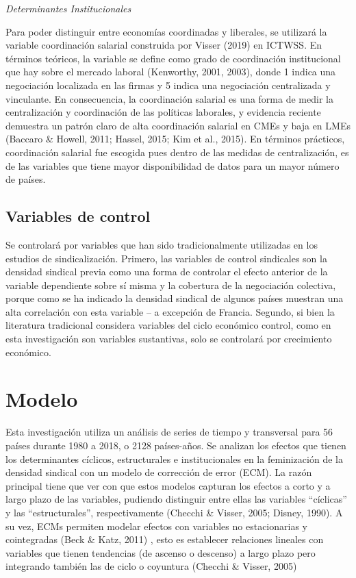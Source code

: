 \documentclass[
]{book}
\begin{document}
\emph{Determinantes Institucionales}

Para poder distinguir entre economías coordinadas y liberales, se utilizará la variable coordinación salarial construida por Visser (2019) en ICTWSS. En términos teóricos, la variable se define como grado de coordinación institucional que hay sobre el mercado laboral (Kenworthy, 2001, 2003), donde 1 indica una negociación localizada en las firmas y 5 indica una negociación centralizada y vinculante. En consecuencia, la coordinación salarial es una forma de medir la centralización y coordinación de las políticas laborales, y evidencia reciente demuestra un patrón claro de alta coordinación salarial en CMEs y baja en LMEs (Baccaro \& Howell, 2011; Hassel, 2015; Kim et al., 2015). En términos prácticos, coordinación salarial fue escogida pues dentro de las medidas de centralización, es de las variables que tiene mayor disponibilidad de datos para un mayor número de países.

\hypertarget{variables-de-control}{%
\subsection{Variables de control}\label{variables-de-control}}

Se controlará por variables que han sido tradicionalmente utilizadas en los estudios de sindicalización. Primero, las variables de control sindicales son la densidad sindical previa como una forma de controlar el efecto anterior de la variable dependiente sobre sí misma y la cobertura de la negociación colectiva, porque como se ha indicado la densidad sindical de algunos países muestran una alta correlación con esta variable -- a excepción de Francia. Segundo, si bien la literatura tradicional considera variables del ciclo económico control, como en esta investigación son variables sustantivas, solo se controlará por crecimiento económico.

\hypertarget{modelo}{%
\section{Modelo}\label{modelo}}

Esta investigación utiliza un análisis de series de tiempo y transversal para 56 países durante 1980 a 2018, o 2128 países-años. Se analizan los efectos que tienen los determinantes cíclicos, estructurales e institucionales en la feminización de la densidad sindical con un modelo de corrección de error (ECM). La razón principal tiene que ver con que estos modelos capturan los efectos a corto y a largo plazo de las variables, pudiendo distinguir entre ellas las variables ``cíclicas'' y las ``estructurales'', respectivamente (Checchi \& Visser, 2005; Disney, 1990). A su vez, ECMs permiten modelar efectos con variables no estacionarias y cointegradas (Beck \& Katz, 2011) , esto es establecer relaciones lineales con variables que tienen tendencias (de ascenso o descenso) a largo plazo pero integrando también las de ciclo o coyuntura (Checchi \& Visser, 2005)
\end{document}
